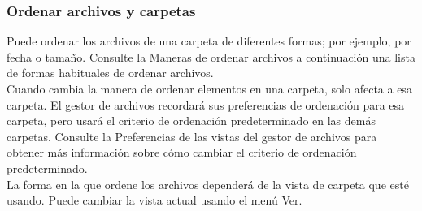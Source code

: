 \subsubsection{Ordenar archivos y carpetas}
Puede ordenar los archivos de una carpeta de diferentes formas; por ejemplo, por fecha o tamaño. Consulte la Maneras de ordenar archivos a continuación una lista de formas habituales de ordenar archivos.\\
Cuando cambia la manera de ordenar elementos en una carpeta, solo afecta a esa carpeta. El gestor de archivos recordará sus preferencias de ordenación para esa carpeta, pero usará el criterio de ordenación predeterminado en las demás carpetas. Consulte la Preferencias de las vistas del gestor de archivos para obtener más información sobre cómo cambiar el criterio de ordenación predeterminado.\\
La forma en la que ordene los archivos dependerá de la vista de carpeta que esté usando. Puede cambiar la vista actual usando el menú Ver.
